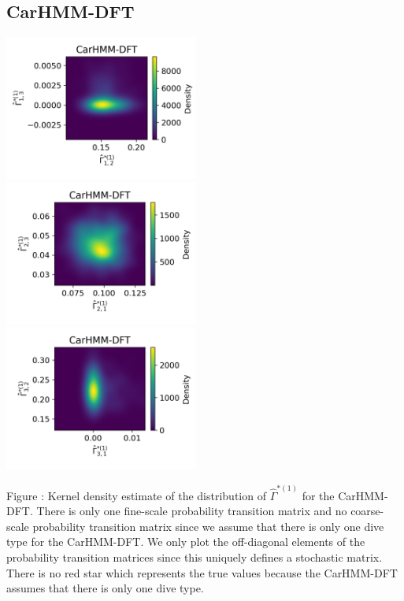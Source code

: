 \documentclass{article}
\begin{document}
        \subsection{CarHMM-DFT}
        \begin{center}
        \includegraphics[width=2.5in]{../Plots/hmm_FV_Gamma_density_0_row_0.png} \\
        \includegraphics[width=2.5in]{../Plots/hmm_FV_Gamma_density_0_row_1.png} \\
        \includegraphics[width=2.5in]{../Plots/hmm_FV_Gamma_density_0_row_2.png} \\
        \end{center}
        
        \noindent Figure : Kernel density estimate of the distribution of $\hat \Gamma^{*(1)}$ for the CarHMM-DFT. There is only one fine-scale probability transition matrix and no coarse-scale probability transition matrix since we assume that there is only one dive type for the CarHMM-DFT. We only plot the off-diagonal elements of the probability transition matrices since this uniquely defines a stochastic matrix. There is no red star which represents the true values because the CarHMM-DFT assumes that there is only one dive type.
        \addtocounter{fignum}{1}
\end{document}

